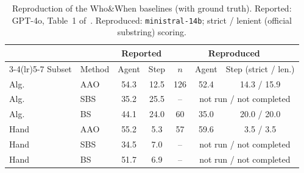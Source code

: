 \begin{table}[t]
\centering
\caption{Reproduction of the Who\&When baselines (with ground truth). Reported: GPT-4o, Table~1 of~\cite{zhang2025whowhen}. Reproduced: \texttt{ministral-14b}; strict / lenient (official substring) scoring.}
\label{tab:repro}
\footnotesize
\setlength{\tabcolsep}{3pt}
\begin{tabular}{@{}llccccc@{}}
\toprule
 & & \multicolumn{2}{c}{Reported} & \multicolumn{3}{c}{Reproduced} \\
\cmidrule(lr){3-4}\cmidrule(lr){5-7}
Subset & Method & Agent & Step & $n$ & Agent & Step (strict / len.) \\
\midrule
Alg. & AAO & 54.3 & 12.5 & 126 & 52.4 & 14.3 / 15.9 \\
Alg. & SBS & 35.2 & 25.5 & -- & \multicolumn{2}{c}{not run / not completed} \\
Alg. & BS & 44.1 & 24.0 & 60 & 35.0 & 20.0 / 20.0 \\
Hand & AAO & 55.2 & 5.3 & 57 & 59.6 & 3.5 / 3.5 \\
Hand & SBS & 34.5 & 7.0 & -- & \multicolumn{2}{c}{not run / not completed} \\
Hand & BS & 51.7 & 6.9 & -- & \multicolumn{2}{c}{not run / not completed} \\
\bottomrule
\end{tabular}
\end{table}